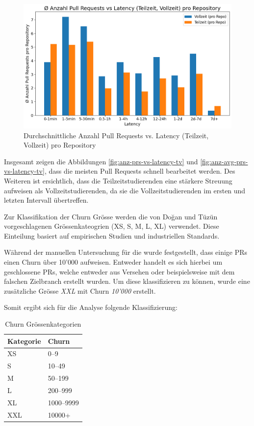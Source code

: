 \begin{figure}[htbp]
    \includegraphics[width=\textwidth]{Figures/anz-avg-prs-vs-latency-tv.png}
    \caption{Durchschnittliche Anzahl Pull Requests vs. Latency (Teilzeit, Vollzeit) pro Repository}
    \label{fig:anz-avg-prs-vs-latency-tv}
\end{figure}
\newpage
Insgesamt zeigen die Abbildungen \autoref{fig:anz-prs-vs-latency-tv} und \autoref{fig:anz-avg-prs-vs-latency-tv}, dass die meisten Pull Requests schnell bearbeitet werden. Des Weiteren ist ersichtlich, dass die Teilzeitstudierenden eine stärkere Streuung aufweisen als Vollzeitstudierenden, da sie die Vollzeitstudierenden im ersten und letzten Intervall übertreffen.

Zur Klassifikation der Churn Grösse werden die von Doğan und Tüzün \parencite{dogan_towards_2022} vorgeschlagenen Grössenkateogrien (XS, S, M, L, XL) verwendet. Diese Einteilung basiert auf empirischen Studien und industriellen Standards. \parencite{dogan_towards_2022}

Während der manuellen Untersuchung für die  wurde festgestellt, dass einige PRs einen Churn über 10'000 aufweisen. Entweder handelt es sich hierbei um geschlossene PRs, welche entweder aus Versehen oder beispielsweise mit dem falschen Zielbranch erstellt wurden. Um diese klassifizieren zu können, wurde eine zusätzliche Grösse \textit{XXL} mit Churn \textit{10'000} erstellt. 

Somit ergibt sich für die Analyse folgende Klassifizierung: 
\begin{table}[ht]
\caption{Churn Grössenkategorien}
\label{tab:churnkategorien}
\centering
\begin{tabular}{l l}
\toprule
\textbf{Kategorie} & \textbf{Churn} \\
\midrule
XS  & 0--9       \\
S        & 10--49     \\
M        & 50--199    \\
L         & 200--999   \\
XL   & 1000--9999 \\
XXL  & 10000+ \\
\bottomrule
\end{tabular}
\end{table}


